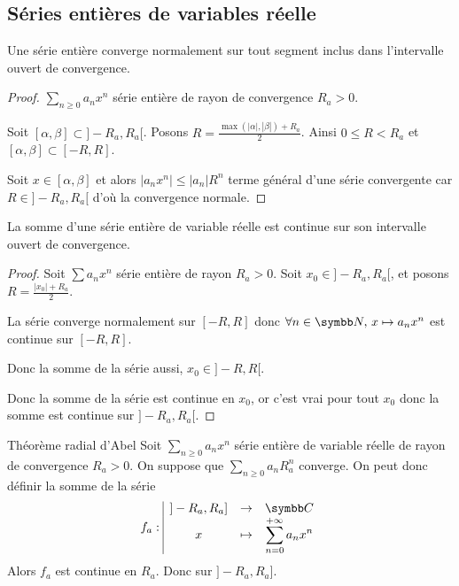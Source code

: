 \subsection{Séries entières de variables réelle }

\begin{theoreme}{}{}
    Une série entière converge normalement sur tout segment inclus dans l'intervalle ouvert de 
    convergence. 
\end{theoreme}

\begin{proof}
    $\sum_{n \geqslant 0 } a_n x^n$ série entière de rayon de convergence $R_a > 0$.

    Soit $[\alpha, \beta] \subset ]-R_a, R_a[$. Posons $R = \frac{\max(|\alpha|, |\beta|) + R_a}{2}$.
    Ainsi $0 \leqslant R < R_a$ et $[\alpha, \beta] \subset [-R, R]$. 

    Soit $x \in [\alpha, \beta]$ et alors 
    $|a_n x^n| \leqslant |a_n| R^n$ terme général d'une série convergente car 
    $R \in ]- R_a, R_a[$ d'où la convergence normale. 
\end{proof}

\begin{corollaire}{}{}
    La somme d'une série entière de variable réelle est continue sur son intervalle 
    ouvert de convergence.
\end{corollaire}

\begin{proof}
    Soit $\sum a_n x^n$ série entière de rayon $R_a > 0$. Soit $x_0 \in ]-R_a, R_a[$, et posons 
    $R = \frac{|x_0| + R_a}{2}$. 

    La série converge normalement sur $[-R, R]$ donc $\forall n \in \N, \, x \mapsto a_n x^n$ 
    est continue sur $[-R, R]$. 

    Donc la somme de la série aussi, $x_0 \in ]-R, R[$.

    Donc la somme de la série est continue en $x_0$, or c'est vrai pour tout 
    $x_0$ donc la somme est continue sur $]-R_a, R_a[$.
\end{proof}

\begin{theoreme}{Théorème radial d'Abel}{}
    Soit $\sum_{n \geqslant 0} a_n x^n$ série entière de variable réelle de rayon de convergence $R_a > 0$.
    On suppose que $\sum_{n \geqslant 0} a_n R_a^n$ converge. 
    On peut donc définir la somme de la série 
    $$\fonction{f_a}{]-R_a, R_a]}{\C}{x}{\sum_{n = 0}^{+\infty} a_n x^n}$$
    Alors $f_a$ est continue en $R_a$. Donc sur $]-R_a, R_a]$.
\end{theoreme}

